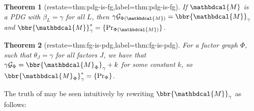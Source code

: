 \documentclass[letterpaper]{article} %
\theoremstyle{plain}
\newtheorem{theorem}{Theorem}%
\theoremstyle{definition}
\theoremstyle{remark}
\newcommand{\thickD}{I\mkern-8muD}
\newcommand{\kldiv}{\thickD\infdivx}
\newcommand{\V}{\mathcal V}
\newcommand{\dg}[1]{\mathbdcal{#1}}
\newcommand{\PDGof}[1]{{\dg M}_{#1}}
\newcommand{\begthm}[2]{\begin{#1}[restate=#2,label=#2]}
\begin{document}
\begthm{theorem}{thm:pdg-is-fg}
If $\dg M$ is a PDG with $\beta_L = \gamma$ for all 
 $L$, then
$\gamma \mathcal G_{\Phi(\dg M)} = \bbr{\dg M}_{\gamma}$ and
$\bbr{\dg M}_{\gamma}^* = \{\Pr_{\Phi({\dg M})} \}$.
\end{theorem}
\begthm{theorem}{thm:fg-is-pdg}
For a factor graph $\Phi$,
such that $\theta_J = \gamma$ for all factors $J$, we have that
	$\gamma \mathcal G_\Phi = \bbr{\PDGof{\Phi}}_{\gamma} + k$        
for some constant $k$, 
so
        $\bbr{\PDGof{\Phi}}_{\gamma}^* = \{\Pr_{\Phi} \}$. 
\end{theorem}
The truth of  may be seen intuitively by rewriting
$\bbr{\dg M}_\gamma$ as follows: 
\end{document}
